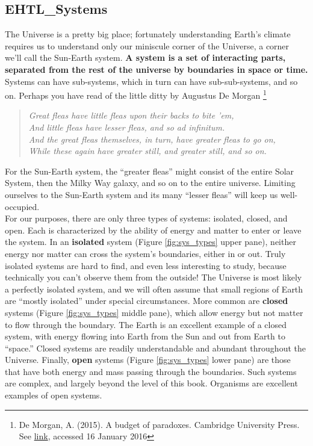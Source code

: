 \subsection{EHTL_Systems}
The Universe is a pretty big place; fortunately understanding Earth's climate requires us to understand only our miniscule corner of the Universe, a corner we'll call the Sun-Earth system. \textbf{A system is a set of interacting parts, separated from the rest of the universe by boundaries in space or time.} Systems can have sub-systems, which in turn can have sub-sub-systems, and so on. Perhaps you have read of the little ditty by Augustus De Morgan \footnote{De Morgan, A. (2015). A budget of paradoxes. Cambridge University Press. See \href{http://articles.latimes.com/1987-03-25/news/vw-191_1_fleast}{link}, accessed 16 January 2016}
\begin{quotation}\noindent\textit{Great fleas have little fleas upon their backs to bite 'em,\\
	And little fleas have lesser fleas, and so ad infinitum.\\
	And the great fleas themselves, in turn, have greater fleas to go on,\\
	While these again have greater still, and greater still, and so on.}
\end{quotation}
For the Sun-Earth system, the ``greater fleas'' might consist of the entire Solar System, then the Milky Way galaxy, and so on to the entire universe. Limiting ourselves to the Sun-Earth system and its many ``lesser fleas'' will keep us well-occupied.\\ 
For our purposes, there are only three types of systems: isolated, closed, and open. Each is characterized by the ability of energy and matter to enter or leave the system. In an \textbf{isolated} system (Figure \ref{fig:sys_types} upper pane), neither energy nor matter can cross the system's boundaries, either in or out. Truly isolated systems are hard to find, and even less interesting to study, because technically you can't observe them from the outside! The Universe is most likely a perfectly isolated system, and we will often assume that small regions of Earth are ``mostly isolated'' under special circumstances. More common are \textbf{closed} systems (Figure \ref{fig:sys_types} middle pane), which allow energy but not matter to flow through the boundary. The Earth is an excellent example of a closed system, with energy flowing into Earth from the Sun and out from Earth to ``space.'' Closed systems are readily understandable and abundant throughout the Universe. Finally, \textbf{open} systems (Figure \ref{fig:sys_types} lower pane) are those that have both energy and mass passing through the boundaries. Such systems are complex, and largely beyond the level of this book. Organisms are excellent examples of open systems.\\

